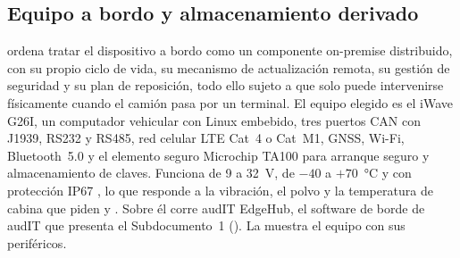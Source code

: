 \subsection{Equipo a bordo y almacenamiento derivado}\label{sec:4-bordo}

 ordena tratar el dispositivo a bordo como un componente on-premise distribuido,
con su propio ciclo de vida, su mecanismo de actualización remota, su gestión de seguridad y su plan
de reposición, todo ello sujeto a que solo puede intervenirse físicamente cuando el camión pasa por un
terminal. El equipo elegido es el iWave G26I, un computador vehicular con Linux embebido, tres puertos
CAN con J1939, RS232 y RS485, red celular LTE Cat~4 o Cat~M1, GNSS, Wi-Fi, Bluetooth~5.0 y el elemento
seguro Microchip TA100 para arranque seguro y almacenamiento de claves. Funciona de 9 a 32~V, de
$-40$ a $+70$~°C y con protección IP67 \parencite{iwave_g26i}, lo que responde a la vibración, el polvo
y la temperatura de cabina que piden  y . Sobre él corre audIT EdgeHub, el software de
borde de audIT que presenta el Subdocumento~1 (). La  muestra el equipo con sus periféricos.


